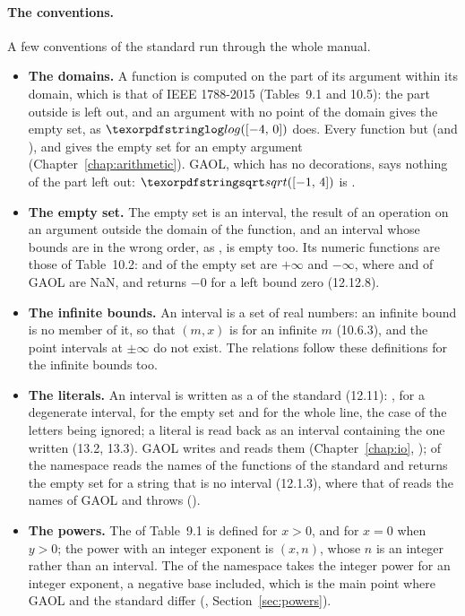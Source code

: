 \paragraph{The conventions.} A few conventions of the standard run through
the whole manual.
\begin{itemize}
\item[$\bullet$] \textbf{The domains.} A function is computed on the part
  of its argument within its domain, which is that of IEEE 1788-2015
  (Tables~9.1 and 10.5): the part outside is left out, and an argument with
  no point of the domain gives the empty set, as $\code{log}(\itv{-4}{0})$
  does.\newinvfive{} Every function but  (and ),
   and  gives the empty set for an empty
  argument (Chapter~\ref{chap:arithmetic}). GAOL, which has no decorations, says nothing of the part left
  out: $\code{sqrt}(\itv{-1}{4})$ is .
\item[$\bullet$] \textbf{The empty set.} The empty set is an interval, the
  result of an operation on an argument outside the domain of the function,
  and an interval whose bounds are in the wrong order, as
  , is empty too. Its numeric functions are those of
  Table~10.2:  and  of the empty set are $+\infty$ and
  $-\infty$, where  and  of GAOL are NaN, and
   returns $-0$ for a left bound zero (12.12.8).
\item[$\bullet$] \textbf{The infinite bounds.} An interval is a set of
  real numbers: an infinite bound is no member of it, so that
  $(m, x)$ is  for an infinite $m$ (10.6.3), and
  the point intervals at $\pm\infty$ do not exist. The relations follow
  these definitions for the infinite bounds too.
\item[$\bullet$] \textbf{The literals.} An interval is written as a
   of the standard (12.11): \code{[l, r]}, \code{[a]} for a
  degenerate interval, \code{[empty]} for the empty set and \code{[entire]}
  for the whole line, the case of the letters being ignored; a literal is
  read back as an interval containing the one written (13.2, 13.3). GAOL writes
  and reads them (Chapter~\ref{chap:io}, );
   of the namespace  reads the
  names of the functions of the standard and returns the empty set for a
  string that is no interval (12.1.3), where that of  reads the
  names of GAOL and throws ().\newinvfive
\item[$\bullet$] \textbf{The powers.} The  of Table~9.1 is
  defined for $x>0$, and for $x=0$ when $y>0$; the power with an integer
  exponent is $(x, n)$, whose $n$ is an integer rather than an
  interval. The  of the namespace  takes the integer
  power for an integer exponent, a negative base included, which is the
  main point where GAOL and the standard differ (,
  Section~\ref{sec:powers}).
\end{itemize}

